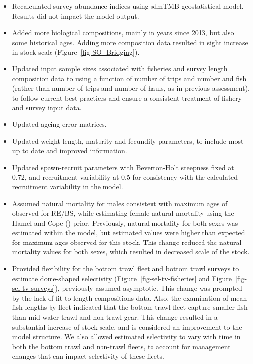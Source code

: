 \documentclass[
]{scrartcl}
\begin{document}
\begin{itemize}
  PacFIN landings were supplemented with the additional estimates of
  RE/BSlandings reported within unspecified rockfish market categories.
  Results did not impact the model output.
\item
  Recalculated survey abundance indices using sdmTMB geostatistical
  model. Results did not impact the model output.
\item
  Added more biological compositions, mainly in years since 2013, but
  also some historical ages. Adding more composition data resulted in
  sight increase in stock scale (Figure~\ref{fig-SO_Bridging}).
\item
  Updated input sample sizes associated with fisheries and survey length
  composition data to using a function of number of trips and number and
  fish (rather than number of trips and number of hauls, as in previous
  assessment), to follow current best practices and ensure a consistent
  treatment of fishery and survey input data.
\item
  Updated ageing error matrices.
\item
  Updated weight-length, maturity and fecundity parameters, to include
  most up to date and improved information.
\item
  Updated spawn-recruit parameters with Beverton-Holt steepness fixed at
  0.72, and recruitment variability at 0.5 for consistency with the
  calculated recruitment variability in the model.
\item
  Assumed natural mortality for males consistent with maximum ages of
  observed for RE/BS, while estimating female natural mortality using
  the Hamel and Cope ()
  prior. Previously, natural mortality for both sexes was estimated
  within the model, but estimated values were higher than expected for
  maximum ages observed for this stock. This change reduced the natural
  mortality values for both sexes, which resulted in decreased scale of
  the stock.
\item
  Provided flexibility for the bottom trawl fleet and bottom trawl
  surveys to estimate dome-shaped selectivity
  (Figure~\ref{fig-sel-tv-fisheries} and
  Figure~\ref{fig-sel-tv-surveys}), previously assumed asymptotic. This
  change was prompted by the lack of fit to length compositions data.
  Also, the examination of mean fish lengths by fleet indicated that the
  bottom trawl fleet capture smaller fish than mid-water trawl and
  non-trawl gear. This change resulted in a substantial increase of
  stock scale, and is considered an improvement to the model structure.
  We also allowed estimated selectivity to vary with time in both the
  bottom trawl and non-trawl fleets, to account for management changes
  that can impact selectivity of these fleets.
\end{itemize}
\end{document}
